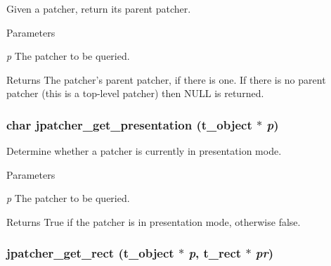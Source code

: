 Given a patcher, return its parent patcher. 
\begin{DoxyParams}{Parameters}
\item[{\em p}]The patcher to be queried. \end{DoxyParams}
\begin{DoxyReturn}{Returns}
The patcher's parent patcher, if there is one. If there is no parent patcher (this is a top-\/level patcher) then NULL is returned. 
\end{DoxyReturn}
\hypertarget{group__jpatcher_gaa3af83f31fba548f05ac23e5f4144ed9}{
\subsubsection[{jpatcher\_\-get\_\-presentation}]{\setlength{\rightskip}{0pt plus 5cm}char jpatcher\_\-get\_\-presentation ({\bf t\_\-object} $\ast$ {\em p})}}
\label{group__jpatcher_gaa3af83f31fba548f05ac23e5f4144ed9}


Determine whether a patcher is currently in presentation mode. 
\begin{DoxyParams}{Parameters}
\item[{\em p}]The patcher to be queried. \end{DoxyParams}
\begin{DoxyReturn}{Returns}
True if the patcher is in presentation mode, otherwise false. 
\end{DoxyReturn}
\hypertarget{group__jpatcher_gaedf734a76297bf735810ac36e17748a1}{
\subsubsection[{jpatcher\_\-get\_\-rect}]{ jpatcher\_\-get\_\-rect ({\bf t\_\-object} $\ast$ {\em p}, \/  {\bf t\_\-rect} $\ast$ {\em pr})}}
\label{group__jpatcher_gaedf734a76297bf735810ac36e17748a1}


